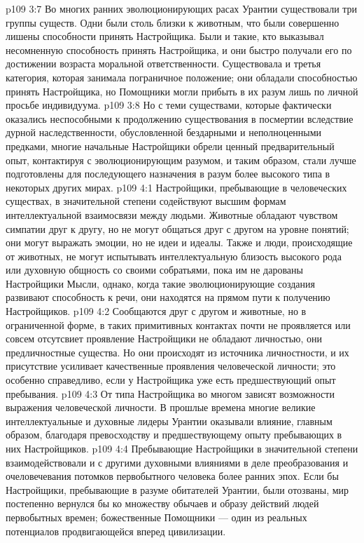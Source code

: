 \vs p109 3:7 \pc Во многих ранних эволюционирующих расах Урантии существовали три группы существ. Одни были столь близки к животным, что были совершенно лишены способности принять Настройщика. Были и такие, кто выказывал несомненную способность принять Настройщика, и они быстро получали его по достижении возраста моральной ответственности. Существовала и третья категория, которая занимала пограничное положение; они обладали способностью принять Настройщика, но Помощники могли прибыть в их разум лишь по личной просьбе индивидуума.
\vs p109 3:8 Но с теми существами, которые фактически оказались неспособными к продолжению существования в посмертии вследствие дурной наследственности, обусловленной бездарными и неполноценными предками, многие начальные Настройщики обрели ценный предварительный опыт, контактируя с эволюционирующим разумом, и таким образом, стали лучше подготовлены для последующего назначения в разум более высокого типа в некоторых других мирах.
\vs p109 4:1 Настройщики, пребывающие в человеческих существах, в значительной степени содействуют высшим формам интеллектуальной взаимосвязи между людьми. Животные обладают чувством симпатии друг к другу, но не могут общаться друг с другом на уровне понятий; они могут выражать эмоции, но не идеи и идеалы. Также и люди, происходящие от животных, не могут испытывать интеллектуальную близость высокого рода или духовную общность со своими собратьями, пока им не дарованы Настройщики Мысли, однако, когда такие эволюционирующие создания развивают способность к речи, они находятся на прямом пути к получению Настройщиков.
\vs p109 4:2 Сообщаются друг с другом и животные, но в ограниченной форме, в таких примитивных контактах почти не проявляется или совсем отсутсвиет проявление  Настройщики не обладают личностью, они предличностные существа. Но они происходят из источника личностности, и их присутствие усиливает качественные проявления человеческой личности; это особенно справедливо, если у Настройщика уже есть предшествующий опыт пребывания.
\vs p109 4:3 От типа Настройщика во многом зависят возможности выражения человеческой личности. В прошлые времена многие великие интеллектуальные и духовные лидеры Урантии оказывали влияние, главным образом, благодаря превосходству и предшествующему опыту пребывающих в них Настройщиков.
\vs p109 4:4 Пребывающие Настройщики в значительной степени взаимодействовали и с другими духовными влияниями в деле преобразования и очеловечевания потомков первобытного человека более ранних эпох. Если бы Настройщики, пребывающие в разуме обитателей Урантии, были отозваны, мир постепенно вернулся бы ко множеству обычаев и образу действий людей первобытных времен; божественные Помощники --- один из реальных потенциалов продвигающейся вперед цивилизации.
